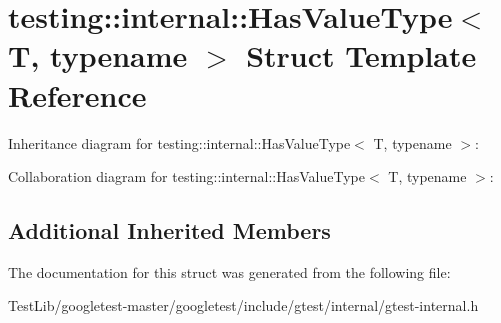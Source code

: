 \hypertarget{structtesting_1_1internal_1_1HasValueType}{}\section{testing\+:\+:internal\+:\+:Has\+Value\+Type$<$ T, typename $>$ Struct Template Reference}
\label{structtesting_1_1internal_1_1HasValueType}


Inheritance diagram for testing\+:\+:internal\+:\+:Has\+Value\+Type$<$ T, typename $>$\+:


Collaboration diagram for testing\+:\+:internal\+:\+:Has\+Value\+Type$<$ T, typename $>$\+:
\subsection*{Additional Inherited Members}


The documentation for this struct was generated from the following file\+:\begin{DoxyCompactItemize}
\item 
Test\+Lib/googletest-\/master/googletest/include/gtest/internal/gtest-\/internal.\+h\end{DoxyCompactItemize}
